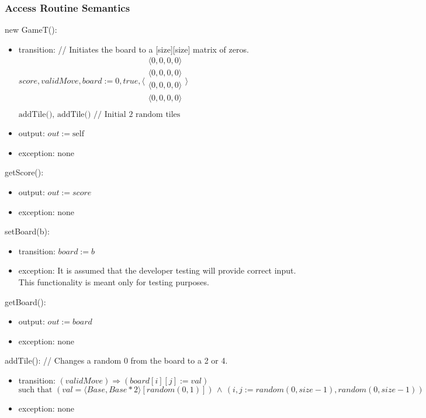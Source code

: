 \documentclass[12pt]{article}
\begin{document}
\subsubsection* {Access Routine Semantics}

\noindent new GameT():
\begin{itemize}
\item transition: // Initiates the board to a [size][size] matrix of zeros.\\

  $\mathit{score}, validMove, board := 0, true,
  \langle \begin{array}{c}
  \langle \mbox{0}, \mbox{0}, \mbox{0}, \mbox{0} \rangle\\
    \langle \mbox{0}, \mbox{0}, \mbox{0}, \mbox{0} \rangle\\
    \langle \mbox{0}, \mbox{0}, \mbox{0}, \mbox{0} \rangle\\
    \langle \mbox{0}, \mbox{0}, \mbox{0}, \mbox{0} \rangle\\
  \end{array} \rangle
  $\\
  $\text{addTile(), addTile()  // Initial 2 random tiles}$\\

\item output: $out := \mbox{self}$
\item exception: none
\end{itemize}

\noindent getScore():
\begin{itemize}
\item output: $out := \mathit{score}$
\item exception: none
\end{itemize}

\noindent setBoard(b):
\begin{itemize}
\item transition: $board:=b$
\item exception: It is assumed that the developer testing will provide correct input. This functionality is meant only for testing purposes.
\end{itemize}
\newpage
\noindent getBoard():
\begin{itemize}
\item output: $out := \mathit{board}$
\item exception: none
\end{itemize}

\noindent addTile(): // Changes a random 0 from the board to a 2 or 4.
\begin{itemize}
\item transition: $(validMove)\Rightarrow(board[i][j]:=val)$\\
$$\text{such that }(val=\langle Base,Base*2\rangle[random(0,1)])\,\land\,(i,j:=random(0,size-1),random(0,size-1))$$
\item exception: none
\end{itemize}
\end{document}
